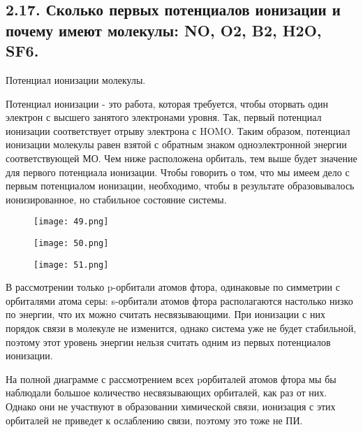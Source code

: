 
	\subsection{2.17. Сколько первых потенциалов ионизации и почему имеют молекулы: NO, O2, B2, H2O, SF6.} 
	
	\par\bigskip
	
	Потенциал ионизации молекулы.
	
	\par\smallskip
	
	Потенциал ионизации - это работа, которая требуется, чтобы
	оторвать один электрон с высшего занятого электронами уровня.
	Так, первый потенциал ионизации соответствует отрыву электрона
	с HOMO. Таким образом, потенциал ионизации молекулы равен
	взятой с обратным знаком одноэлектронной энергии
	соответствующей МО. Чем ниже расположена орбиталь, тем выше
	будет значение для первого потенциала ионизации. Чтобы говорить
	о том, что мы имеем дело с первым потенциалом ионизации,
	необходимо, чтобы в результате образовывалось ионизированное,
	но стабильное состояние системы.
	
		\begin{figure}[H]
		\centering
		{\texttt{[image: 49.png]}}
	\end{figure}

	\begin{figure}[H]
	\centering
	{\texttt{[image: 50.png]}}
\end{figure}
	
		\begin{figure}[H]
		\centering
		{\texttt{[image: 51.png]}}
	\end{figure}

В рассмотрении только p-орбитали атомов фтора, одинаковые по
симметрии с орбиталями атома серы: s-орбитали атомов фтора располагаются настолько
низко по энергии, что их можно считать
несвязывающими. При ионизации с них порядок связи
в молекуле не изменится, однако система уже не будет
стабильной, поэтому этот уровень энергии нельзя
считать одним из первых потенциалов ионизации.

\par\smallskip


На полной диаграмме с рассмотрением всех pорбиталей атомов фтора мы бы наблюдали большое
количество несвязывающих орбиталей, как раз от них.
Однако они не участвуют в образовании химической
связи, ионизация с этих орбиталей не приведет к
ослаблению связи, поэтому это тоже не ПИ.


